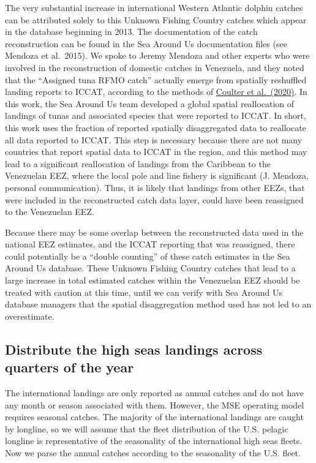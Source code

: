 \documentclass[
]{article}
\begin{document}
The very substantial increase in international Western Atlantic dolphin
catches can be attributed solely to this Unknown Fishing Country catches
which appear in the database beginning in 2013. The documentation of the
catch reconstruction can be found in the Sea Around Us documentation
files (see Mendoza et al.~2015). We spoke to Jeremy Mendoza and other
experts who were involved in the reconstruction of domestic catches in
Venezuela, and they noted that the ``Assigned tuna RFMO catch'' actually
emerge from spatially reshuffled landing reports to ICCAT, according to
the methods of
\href{https://www.sciencedirect.com/science/article/abs/pii/S0165783619302346}{Coulter
et al.~(2020)}. In this work, the Sea Around Us team developed a global
spatial reallocation of landings of tunas and associated species that
were reported to ICCAT. In short, this work uses the fraction of
reported spatially disaggregated data to reallocate all data reported to
ICCAT. This step is necessary because there are not many countries that
report spatial data to ICCAT in the region, and this method may lead to
a significant reallocation of landings from the Caribbean to the
Venezuelan EEZ, where the local pole and line fishery is significant (J.
Mendoza, personal communication). Thus, it is likely that landings from
other EEZs, that were included in the reconstructed catch data layer,
could have been reassigned to the Venezuelan EEZ.

Because there may be some overlap between the reconstructed data used in
the national EEZ estimates, and the ICCAT reporting that was reassigned,
there could potentially be a ``double counting'' of these catch
estimates in the Sea Around Us database. These Unknown Fishing Country
catches that lead to a large increase in total estimated catches within
the Venezuelan EEZ should be treated with caution at this time, until we
can verify with Sea Around Us database managers that the spatial
disaggregation method used has not led to an overestimate.

\subsection{Distribute the high seas landings across quarters of the
year}\label{distribute-the-high-seas-landings-across-quarters-of-the-year-1}

The international landings are only reported as annual catches and do
not have any month or season associated with them. However, the MSE
operating model requires seasonal catches. The majority of the
international landings are caught by longline, so we will assume that
the fleet distribution of the U.S. pelagic longline is representative of
the seasonality of the international high seas fleets. Now we parse the
annual catches according to the seasonality of the U.S. fleet.
\end{document}
